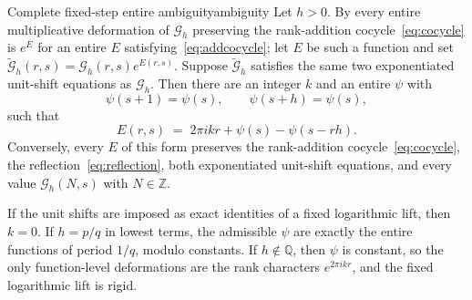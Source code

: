 \documentclass[11pt,letterpaper]{article}
\newcommand{\Gc}{\mathcal{G}}               %
\newcommand{\Zint}{\mathbb{Z}}
\newcommand{\Qq}{\mathbb{Q}}
\begin{document}
\begin{theorem}{Complete fixed-step entire ambiguity}{ambiguity}
Let $h>0$. By  every entire multiplicative deformation of
$\Gc_h$ preserving the rank-addition cocycle~\eqref{eq:cocycle} is $e^{E}$ for an
entire $E$ satisfying~\eqref{eq:addcocycle}; let $E$ be such a function and set
$\widetilde{\Gc}_h(r,s)=\Gc_h(r,s)e^{E(r,s)}$.
Suppose $\widetilde{\Gc}_h$ satisfies the same two exponentiated unit-shift
equations as $\Gc_h$. Then there are an integer $k$ and an entire $\psi$ with
\begin{equation}
  \psi(s+1)=\psi(s),\qquad \psi(s+h)=\psi(s),
  \label{eq:bothperiods}
\end{equation}
such that
\begin{equation}
  E(r,s)\;=\;2\pi ikr+\psi(s)-\psi(s-rh).
  \label{eq:ambiguity}
\end{equation}
Conversely, every $E$ of this form preserves the rank-addition
cocycle~\eqref{eq:cocycle}, the reflection~\eqref{eq:reflection}, both
exponentiated unit-shift equations, and every value $\Gc_h(N,s)$ with
$N\in\Zint$.

If the unit shifts are imposed as exact identities of a fixed logarithmic lift,
then $k=0$. If $h=p/q$ in lowest terms, the admissible $\psi$ are exactly the
entire functions of period $1/q$, modulo constants. If $h\notin\Qq$, then $\psi$
is constant, so the only function-level deformations are the rank characters
$e^{2\pi ikr}$, and the fixed logarithmic lift is rigid.
\end{theorem}
\end{document}
